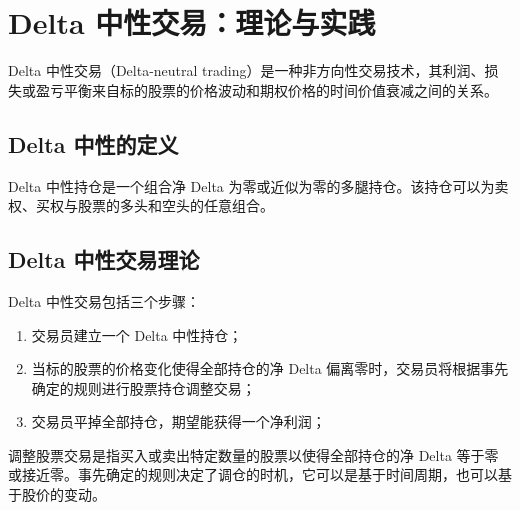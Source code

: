 \chapter{Delta 中性交易：理论与实践}
Delta 中性交易（Delta-neutral trading）是一种非方向性交易技术，其利润、损失或盈亏平衡来自标的股票的价格波动和期权价格的时间价值衰减之间的关系。
\section{Delta 中性的定义}
Delta 中性持仓是一个组合净 Delta 为零或近似为零的多腿持仓。该持仓可以为卖权、买权与股票的多头和空头的任意组合。
\section{Delta 中性交易理论}
Delta 中性交易包括三个步骤：
\begin{enumerate}
    \item 交易员建立一个 Delta 中性持仓；
    \item 当标的股票的价格变化使得全部持仓的净 Delta 偏离零时，交易员将根据事先确定的规则进行股票持仓调整交易；
    \item 交易员平掉全部持仓，期望能获得一个净利润；
\end{enumerate}

调整股票交易是指买入或卖出特定数量的股票以使得全部持仓的净 Delta 等于零或接近零。事先确定的规则决定了调仓的时机，它可以是基于时间周期，也可以基于股价的变动。